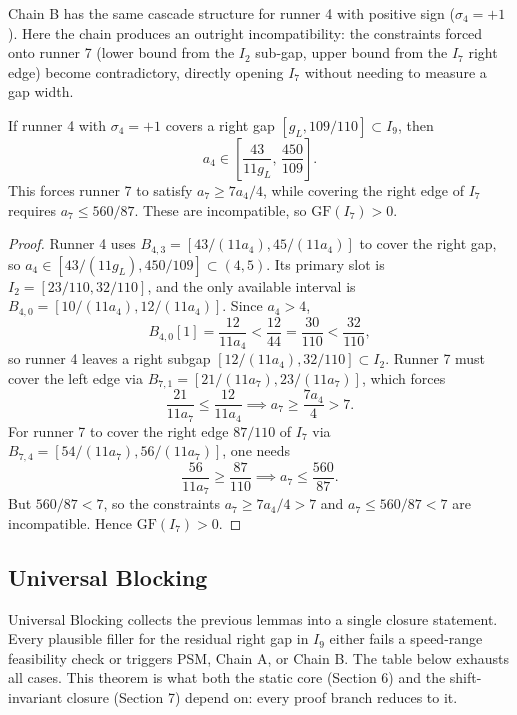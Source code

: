 \documentclass[12pt]{article}
\begin{document}
Chain B has the same cascade structure for runner 4 with positive sign ($\sigma_4=+1$). Here the chain
produces an outright incompatibility: the constraints forced onto runner 7 (lower bound
from the $I_2$ sub-gap, upper bound from the $I_7$ right edge) become contradictory,
directly opening $I_7$ without needing to measure a gap width.

\begin{lemma}[Chain B]\label{l:54}
If runner 4 with $\sigma_4=+1$ covers a right gap
$[g_L,109/110]\subset I_9$, then
\[
a_4 \in \left[\frac{43}{11g_L},\,\frac{450}{109}\right].
\]
This forces runner 7 to satisfy $a_7\ge 7a_4/4$, while covering the right edge of $I_7$
requires $a_7\le 560/87$. These are incompatible, so $\mathrm{GF}(I_7)>0$.

\end{lemma}
\begin{proof}
Runner 4 uses $B_{4,3}=[43/(11a_4),45/(11a_4)]$ to cover the right gap, so
$a_4\in[43/(11g_L),450/109]\subset(4,5)$. Its primary slot is $I_2=[23/110,32/110]$, and
the only available interval is $B_{4,0}=[10/(11a_4),12/(11a_4)]$. Since $a_4>4$,
\[
B_{4,0}[1] = \frac{12}{11a_4} < \frac{12}{44} = \frac{30}{110} < \frac{32}{110},
\]
so runner 4 leaves a right subgap $[12/(11a_4),32/110]\subset I_2$. Runner 7 must cover
the left edge via $B_{7,1}=[21/(11a_7),23/(11a_7)]$, which forces
\[
\frac{21}{11a_7} \le \frac{12}{11a_4} \implies a_7 \ge \frac{7a_4}{4} > 7.
\]
For runner 7 to cover the right edge $87/110$ of $I_7$
via $B_{7,4}=[54/(11a_7),56/(11a_7)]$, one needs
\[
\frac{56}{11a_7} \ge \frac{87}{110} \implies a_7 \le \frac{560}{87}.
\]
But $560/87<7$, so the constraints $a_7\ge 7a_4/4>7$
and $a_7\le 560/87<7$ are incompatible. Hence $\mathrm{GF}(I_7)>0$.
\end{proof}

\subsection{Universal Blocking}

Universal Blocking collects the previous lemmas into a single closure statement. Every
plausible filler for the residual right gap in $I_9$ either fails a speed-range feasibility
check or triggers PSM, Chain A, or Chain B. The table below exhausts all cases. This
theorem is what both the static core (Section 6) and the shift-invariant closure (Section 7)
depend on: every proof branch reduces to it.
\end{document}

